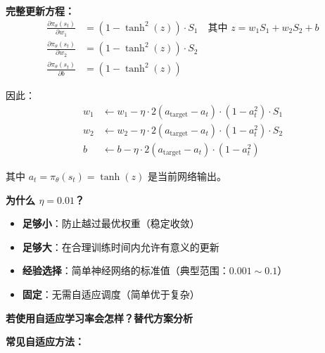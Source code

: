\documentclass[11pt,a3paper]{ctexart}
\begin{document}
\textbf{完整更新方程：}
\begin{align}
\frac{\partial \pi_\theta(s_t)}{\partial w_1} &= (1 - \tanh^2(z)) \cdot S_1 \quad \text{其中 } z = w_1 S_1 + w_2 S_2 + b \\
\frac{\partial \pi_\theta(s_t)}{\partial w_2} &= (1 - \tanh^2(z)) \cdot S_2 \\
\frac{\partial \pi_\theta(s_t)}{\partial b} &= (1 - \tanh^2(z))
\end{align}

因此：
\begin{align}
w_1 &\leftarrow w_1 - \eta \cdot 2(a_{\text{target}} - a_t) \cdot (1 - a_t^2) \cdot S_1 \\
w_2 &\leftarrow w_2 - \eta \cdot 2(a_{\text{target}} - a_t) \cdot (1 - a_t^2) \cdot S_2 \\
b &\leftarrow b - \eta \cdot 2(a_{\text{target}} - a_t) \cdot (1 - a_t^2)
\end{align}

其中 $a_t = \pi_\theta(s_t) = \tanh(z)$ 是当前网络输出。

\textbf{为什么 $\eta = 0.01$？}
\begin{itemize}
    \item \textbf{足够小}：防止越过最优权重（稳定收敛）
    \item \textbf{足够大}：在合理训练时间内允许有意义的更新
    \item \textbf{经验选择}：简单神经网络的标准值（典型范围：$0.001 \sim 0.1$）
    \item \textbf{固定}：无需自适应调度（简单优于复杂）
\end{itemize}

\textbf{若使用自适应学习率会怎样？替代方案分析}

\textbf{常见自适应方法：}
\end{document}
